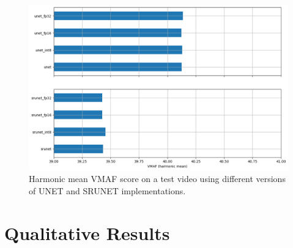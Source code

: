 \begin{figure}[h]
\includegraphics[width=1.0\textwidth]{static/2023_03_17_barplot_vmaf_harmonic_mean.png}
\caption{Harmonic mean VMAF score on a test video using different versions of UNET and SRUNET implementations.}
\label{fig:vmaf-harmonic-mean}
\end{figure}

\clearpage

\section{Qualitative Results}
\label{sec:qualitative-results}

